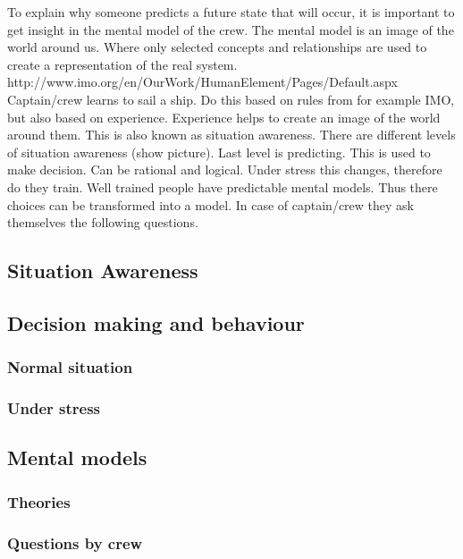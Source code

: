 To explain why someone predicts a future state that will occur, it is important to get insight in the mental model of the crew.
The mental model is an image of the world around us. Where only selected concepts and relationships are used to create a representation of the real system. \\



http://www.imo.org/en/OurWork/HumanElement/Pages/Default.aspx \\
 
Captain/crew learns to sail a ship. 
Do this based on rules from for example IMO, but also based on experience. 
Experience helps to create an image of the world around them. 
This is also known as situation awareness. 
There are different levels of situation awareness (show picture). 
Last level is predicting. This is used to make decision. Can be rational and logical. Under stress this changes, therefore do they train.
Well trained people have predictable mental models. Thus there choices can be transformed into a model.
In case of captain/crew they ask themselves the following questions.

\subsection{Situation Awareness}

\subsection{Decision making and behaviour}

\subsubsection{Normal situation}

\subsubsection{Under stress}

\subsection{Mental models}

\subsubsection{Theories}

\subsubsection{Questions by crew}